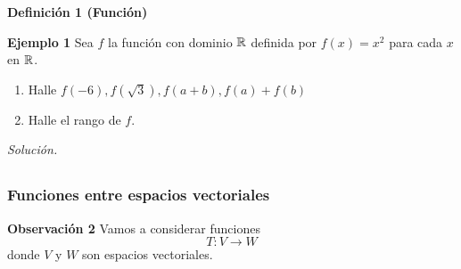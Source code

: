 {\begin{frame}
\begin{block}{\textbf{Definición 1 (Función)}}
\end{block}


\begin{ej}{\textbf{Ejemplo 1}}
	\justifying
	Sea $f$ la función con dominio $\mathbb{R}$ definida por $f(x)=x^2$ para cada $x$ en $\mathbb{R}$.
	\begin{enumerate}
		\item[\labelname{$a$}] Halle $f(-6), f(\sqrt{3}), f(a+b), f(a)+ f(b)$
		\item[\labelname{$b$}] Halle el rango de $f$.
	\end{enumerate}
\end{ej}
\textit{Solución.}

\end{frame}
}


\subsection{}

\begin{frame}[c]\frametitle{Funciones entre espacios vectoriales}

\begin{alertblock}{\textbf{Observación 2}}
	Vamos a considerar funciones 
	\[
		T:V \to W
	\]
	donde $V$ y $W$ son espacios vectoriales.
\end{alertblock}


\end{frame}


